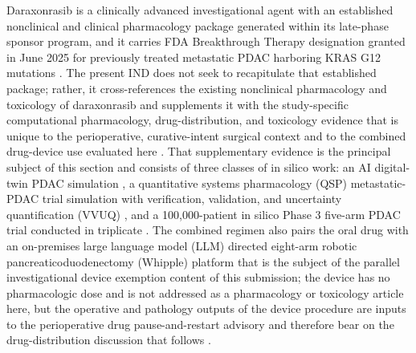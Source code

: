 Daraxonrasib is a clinically advanced investigational agent with an established
nonclinical and clinical pharmacology package generated within its late-phase
sponsor program, and it carries FDA Breakthrough Therapy designation granted in
June 2025 for previously treated metastatic PDAC harboring KRAS G12 mutations
\cite{daraxwhipple}. The present IND does not seek to recapitulate that
established package; rather, it cross-references the existing nonclinical
pharmacology and toxicology of daraxonrasib and supplements it with the
study-specific computational pharmacology, drug-distribution, and toxicology
evidence that is unique to the perioperative, curative-intent surgical context
and to the combined drug-device use evaluated here \cite{daraxwhipple,onpremwhippl}.
That supplementary evidence is the principal subject of this section and consists
of three classes of in silico work: an AI digital-twin PDAC simulation
\cite{fdadigtwinpc}, a quantitative systems pharmacology (QSP) metastatic-PDAC
trial simulation with verification, validation, and uncertainty quantification
(VVUQ) \cite{qspmetpancre}, and a 100,000-patient in silico Phase 3 five-arm
PDAC trial conducted in triplicate \cite{chatgpt100kp,pdacdigtwinp}. The combined
regimen also pairs the oral drug with an on-premises large language model (LLM)
directed eight-arm robotic pancreaticoduodenectomy (Whipple) platform that is the
subject of the parallel investigational device exemption content of this
submission; the device has no pharmacologic dose and is not addressed as a
pharmacology or toxicology article here, but the operative and pathology outputs
of the device procedure are inputs to the perioperative drug pause-and-restart
advisory and therefore bear on the drug-distribution discussion that follows
\cite{daraxwhipple}.

\clearpage

